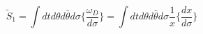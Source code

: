 \begin{equation}\label{S1N2T}
 \tilde S_1=\int dtd\theta d\bar{\theta}d\sigma\{\frac{\omega_D}{d\sigma}\}=
\int dtd\theta d\bar{\theta} d\sigma \frac{1}{x} \{\frac{dx}{d\sigma}\}
\end{equation}

